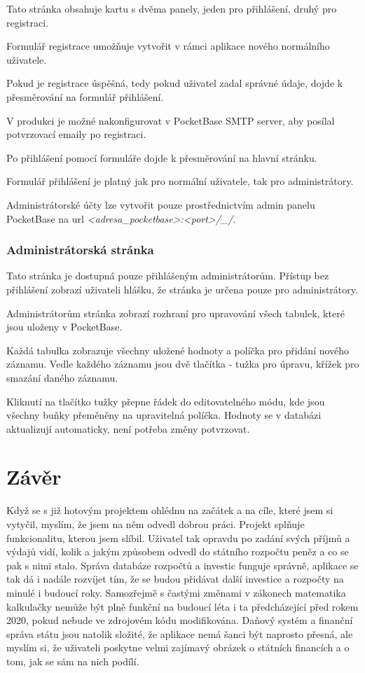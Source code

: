 \documentclass[11pt,a4paper,twoside,openright]{report}
\begin{document}
Tato stránka obsahuje kartu s dvěma panely, jeden pro přihlášení, druhý pro
registraci.

Formulář registrace umožňuje vytvořit v rámci aplikace nového normálního
uživatele.

Pokud je registrace úspěšná, tedy pokud uživatel zadal správné údaje,
dojde k přesměrování na formulář přihlášení.

V produkci je možné nakonfigurovat v PocketBase SMTP server, aby posílal potvrzovací
emaily po registraci.

Po přihlášení pomocí formuláře dojde k přesměrování na hlavní stránku.

Formulář přihlášení je platný jak pro normální uživatele, tak pro administrátory.

Administrátorské účty lze vytvořit pouze prostřednictvím admin panelu PocketBase
na url \emph{<adresa\_pocketbase>:<port>/\_/}.

\subsection{Administrátorská stránka}

Tato stránka je dostupná pouze přihlášeným administrátorům. Přístup bez přihlášení
zobrazí uživateli hlášku, že stránka je určena pouze pro administrátory.

Administrátorům stránka zobrazí rozhraní pro upravování všech tabulek, které jsou
uloženy v PocketBase.

Každá tabulka zobrazuje všechny uložené hodnoty a políčka pro přidání nového záznamu.
Vedle každého záznamu jsou dvě tlačítka - tužka pro úpravu, křížek pro smazání daného
záznamu.

Kliknutí na tlačítko tužky přepne řádek do editovatelného módu, kde jsou všechny
buňky přeměněny na upravitelná políčka. Hodnoty se v databázi aktualizují automaticky,
není potřeba změny potvrzovat.

\chapter*{Závěr}
\pagestyle{empty}

Když se s již  hotovým projektem ohlédnu na začátek a na cíle, které jsem si vytyčil,
myslím, že jsem na něm odvedl dobrou práci. Projekt splňuje funkcionalitu, kterou jsem slíbil.
Uživatel tak opravdu po zadání svých příjmů a výdajů vidí, kolik a jakým způsobem odvedl do
státního rozpočtu peněz a co se pak s nimi stalo. Správa databáze rozpočtů a investic funguje
správně, aplikace se tak dá i nadále rozvíjet tím, že se budou přidávat další investice a rozpočty
na minulé i budoucí roky. Samozřejmě s častými změnami v zákonech matematika kalkulačky nemůže
být plně funkční na budoucí léta i ta předcházející před rokem 2020, pokud nebude ve
zdrojovém kódu modifikována. Daňový systém a finanční správa státu jsou natolik složité, že
aplikace nemá šanci být naprosto přesná, ale myslím si, že uživateli poskytne velmi zajímavý
obrázek o státních financích a o tom, jak se sám na nich podílí.
\end{document}
